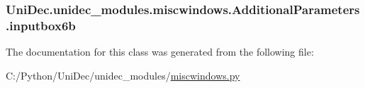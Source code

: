 \subsubsection[{inputbox6b}]{\setlength{\rightskip}{0pt plus 5cm}Uni\+Dec.\+unidec\+\_\+modules.\+miscwindows.\+Additional\+Parameters.\+inputbox6b}\label{class_uni_dec_1_1unidec__modules_1_1miscwindows_1_1_additional_parameters_aa3e24d64bf0af57383e955787aa254d6}


The documentation for this class was generated from the following file\+:\begin{DoxyCompactItemize}
\item 
C\+:/\+Python/\+Uni\+Dec/unidec\+\_\+modules/\hyperlink{miscwindows_8py}{miscwindows.\+py}\end{DoxyCompactItemize}
